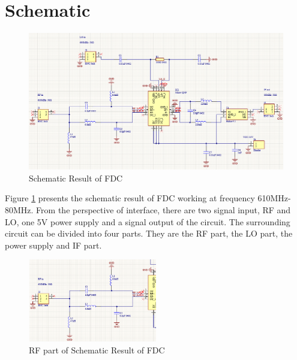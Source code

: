 \documentclass[12pt, a4paper]{report}
\begin{document}
\section{Schematic}

\begin{figure}[htbp]     \begin{centering}
    \includegraphics[width=1\textwidth]{img/sch0.png}
    \caption{\label{Fig:sch0}Schematic Result of FDC}
    \end{centering}
    
\end{figure}

Figure \ref{Fig:sch0} presents the schematic result of FDC working at frequency 610MHz-80MHz. From the perspective of interface, there are two signal input, RF and LO, one 5V power supply and a signal output of the circuit. The surrounding circuit can be divided into four parts. They are the RF part, the LO part, the power supply and IF part.

\begin{figure}[htbp]     \begin{centering}
    \includegraphics[width=0.5\textwidth]{img/sch0_rf.png}
    \caption{\label{Fig:sch0_rf}RF part of Schematic Result of FDC}
    \end{centering}
    
\end{figure}
\end{document}
